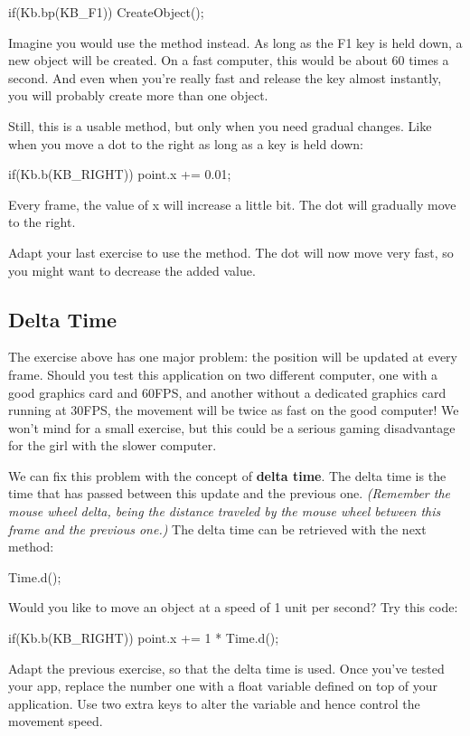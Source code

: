 \begin{code}
if(Kb.bp(KB_F1)) CreateObject();
\end{code}

Imagine you would use the method  instead. As long as the F1 key is held down, a new object will be created. On a fast computer, this would be about 60 times a second. And even when you're really fast and release the key almost instantly, you will probably create more than one object.

Still, this is a usable method, but only when you need gradual changes. Like when you move a dot to the right as long as a key is held down:

\begin{code}
if(Kb.b(KB_RIGHT)) point.x += 0.01;
\end{code}

Every frame, the value of x will increase a little bit. The dot will gradually move to the right.

\begin{exercise}
Adapt your last exercise to use the  method. The dot will now move very fast, so you might want to decrease the added value.
\end{exercise}

\subsection{Delta Time}
The exercise above has one major problem: the position will be updated at every frame. Should you test this application on two different computer, one with a good graphics card and 60FPS, and another without a dedicated graphics card running at 30FPS, the movement will be twice as fast on the good computer! We won't mind for a small exercise, but this could be a serious gaming disadvantage for the girl with the slower computer.

We can fix this problem with the concept of \textbf{delta time}. The delta time is the time that has passed between this update and the previous one. \textsl{(Remember the mouse wheel delta, being the distance traveled by the mouse wheel between this frame and the previous one.)} The delta time can be retrieved with the next method:

\begin{code}
Time.d();
\end{code}
Would you like to move an object at a speed of 1 unit per second? Try this code:

\begin{code}
if(Kb.b(KB_RIGHT)) point.x += 1 * Time.d();
\end{code}

\begin{exercise}
Adapt the previous exercise, so that the delta time is used. Once you've tested your app, replace the number one with a float variable defined on top of your application. Use two extra keys to alter the variable and hence control the movement speed.
\end{exercise}



